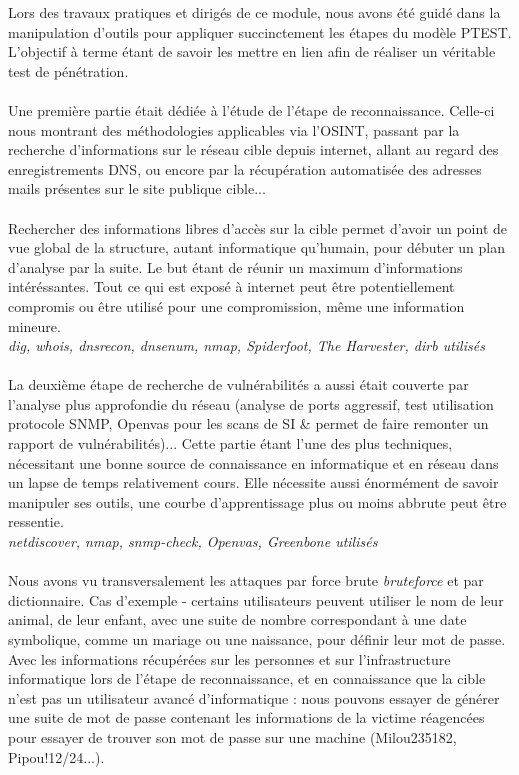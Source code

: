 Lors des travaux pratiques et dirigés de ce module, nous avons été guidé dans la manipulation d'outils pour appliquer succinctement les étapes du modèle PTEST. L'objectif à terme étant de savoir les mettre en lien afin de réaliser un véritable test de pénétration.
\\ \\
Une première partie était dédiée à l'étude de l'étape de reconnaissance. Celle-ci nous montrant des méthodologies applicables via l'OSINT, passant par la recherche d'informations sur le réseau cible depuis internet, allant au regard des enregistrements DNS, ou encore par la récupération automatisée des adresses mails présentes sur le site publique cible...  
\\ \\
Rechercher des informations libres d'accès sur la cible permet d'avoir un point de vue global de la structure, autant informatique qu'humain, pour débuter un plan d'analyse par la suite. Le but étant de réunir un maximum d'informations intéréssantes. Tout ce qui est exposé à internet peut être potentiellement compromis ou être utilisé pour une compromission, même une information mineure.
\\
\textit{dig, whois, dnsrecon, dnsenum, nmap, Spiderfoot, The Harvester, dirb utilisés}
\\ \\
La deuxième étape de recherche de vulnérabilités a aussi était couverte par l'analyse plus approfondie du réseau (analyse de ports aggressif, test utilisation protocole SNMP, Openvas pour les scans de SI \& permet de faire remonter un rapport de vulnérabilités)... Cette partie étant l'une des plus techniques, nécessitant une bonne source de connaissance en informatique et en réseau dans un lapse de temps relativement cours. Elle nécessite aussi énormément de savoir manipuler ses outils, une courbe d'apprentissage plus ou moins abbrute peut être ressentie.
\\
\textit{netdiscover, nmap, snmp-check, Openvas, Greenbone utilisés}
\\ \\
Nous avons vu transversalement les attaques par force brute \textit{bruteforce} et par dictionnaire. Cas d'exemple - certains utilisateurs peuvent utiliser le nom de leur animal, de leur enfant, avec une suite de nombre correspondant à une date symbolique, comme un mariage ou une naissance, pour définir leur mot de passe. Avec les informations récupérées sur les personnes et sur l'infrastructure informatique lors de l'étape de reconnaissance, et en connaissance que la cible n'est pas un utilisateur avancé d'informatique : nous pouvons essayer de générer une suite de mot de passe contenant les informations de la victime réagencées pour essayer de trouver son mot de passe sur une machine (Milou235182, Pipou!12/24...).
